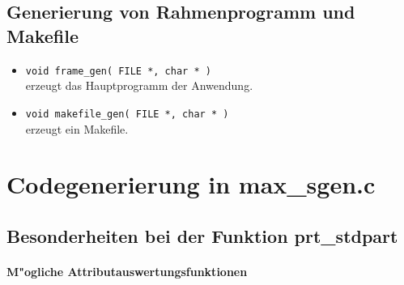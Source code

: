 \subsection{Generierung von Rahmenprogramm und Makefile}

\begin{itemize}
\item {\tt void frame\_gen( FILE *, char * )}\\
erzeugt das Hauptprogramm der Anwendung.

\item {\tt void makefile\_gen( FILE *, char * )}\\
erzeugt ein Makefile.

\end{itemize}

\newpage
\section{Codegenerierung in max\_sgen.c}


\subsection{Besonderheiten bei der Funktion prt\_stdpart}


\paragraph{M"ogliche Attributauswertungsfunktionen}

